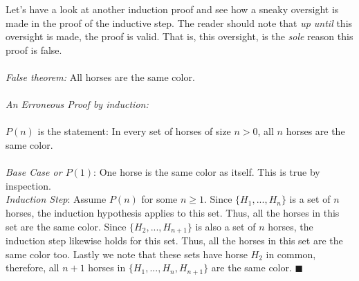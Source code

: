\noindent Let's have a look at another induction proof and  see how a sneaky oversight is made in the proof of the inductive step. The reader should note that \textit{up until} this oversight is made, the proof is valid. That is, this oversight, is the \textit{sole} reason this proof is false. \\ \\
\noindent \textit{False theorem:} All horses are the same color.\\ \\
\textit{An Erroneous Proof by induction:}\\ \\
$P(n)$ is the statement: In every set of horses of size $n>0$, all $n$ horses are the same color.\\ \\
\textit{Base Case or $P(1)$}: One horse is the same color as itself. This is true by inspection. \\
\textit{Induction Step}: Assume $P(n)$ for some $n\geq 1$. Since $\{H_1,...,H_n\}$ is a set of $n$ horses, the induction hypothesis applies to this set. Thus, all the horses in this set are the same color.
Since $\{ H_2,...,H_{n+1}\}$ is also a set of $n$ horses, the induction step likewise holds for this set. Thus, all the horses in this set are the same color too. Lastly we note that these sets have horse $H_2$ in common, therefore, all $n+1$ horses in $\{H_1,...,H_n,H_{n+1}\}$ are the same color. $\blacksquare$

